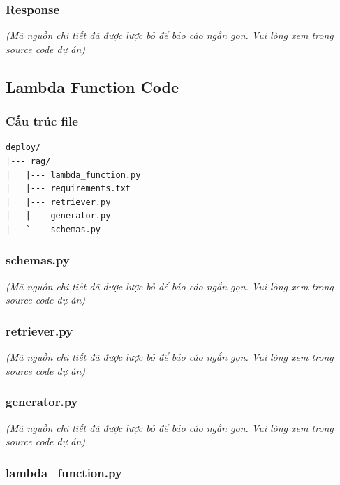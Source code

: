 \hypertarget{response}{%
\subsubsection{Response}}

\emph{(Mã nguồn chi tiết đã được lược bỏ để báo cáo ngắn gọn. Vui lòng
xem trong source code dự án)}

\hypertarget{lambda-function-code}{%
\subsection{Lambda Function Code}}

\hypertarget{cux1ea5u-truxfac-file}{%
\subsubsection{Cấu trúc file}}

\begin{verbatim}
deploy/
|--- rag/
|   |--- lambda_function.py
|   |--- requirements.txt
|   |--- retriever.py
|   |--- generator.py
|   `--- schemas.py
\end{verbatim}

\hypertarget{schemas.py}{%
\subsubsection{schemas.py}}

\emph{(Mã nguồn chi tiết đã được lược bỏ để báo cáo ngắn gọn. Vui lòng
xem trong source code dự án)}

\hypertarget{retriever.py}{%
\subsubsection{retriever.py}}

\emph{(Mã nguồn chi tiết đã được lược bỏ để báo cáo ngắn gọn. Vui lòng
xem trong source code dự án)}

\hypertarget{generator.py}{%
\subsubsection{generator.py}}

\emph{(Mã nguồn chi tiết đã được lược bỏ để báo cáo ngắn gọn. Vui lòng
xem trong source code dự án)}

\hypertarget{lambda_function.py}{%
\subsubsection{lambda\_function.py}}

